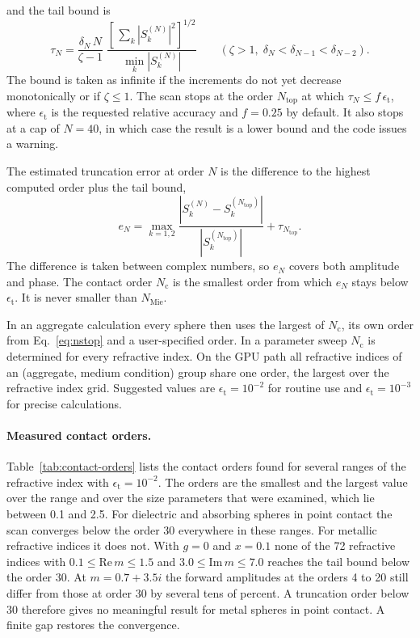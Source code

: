 \documentclass[11pt,a4paper]{article}
\begin{document}
and the tail bound is
\begin{equation}
  \tau_N = \frac{\delta_N\,N}{\zeta - 1}\;
           \frac{\left[\,\sum_k |S_k^{(N)}|^2\right]^{1/2}}{\min_k |S_k^{(N)}|}
  \qquad (\zeta > 1,\; \delta_N < \delta_{N-1} < \delta_{N-2}).
  \label{eq:contact-tail}
\end{equation}
The bound is taken as infinite if the increments do not yet decrease monotonically or if $\zeta \leq 1$.
The scan stops at the order $N_\mathrm{top}$ at which $\tau_N \leq f\,\epsilon_\mathrm{t}$, where $\epsilon_\mathrm{t}$ is the requested relative accuracy and $f = 0.25$ by default.
It also stops at a cap of $N = 40$, in which case the result is a lower bound and the code issues a warning.

The estimated truncation error at order $N$ is the difference to the highest computed order plus the tail bound,
\begin{equation}
  e_N = \max_{k=1,2} \frac{\left|S_k^{(N)} - S_k^{(N_\mathrm{top})}\right|}{\left|S_k^{(N_\mathrm{top})}\right|} + \tau_{N_\mathrm{top}}.
  \label{eq:contact-error}
\end{equation}
The difference is taken between complex numbers, so $e_N$ covers both amplitude and phase.
The contact order $N_\mathrm{c}$ is the smallest order from which $e_N$ stays below $\epsilon_\mathrm{t}$.
It is never smaller than $N_\mathrm{Mie}$.

In an aggregate calculation every sphere then uses the largest of $N_\mathrm{c}$, its own order from Eq.~\eqref{eq:nstop} and a user-specified order.
In a parameter sweep $N_\mathrm{c}$ is determined for every refractive index.
On the GPU path all refractive indices of an (aggregate, medium condition) group share one order, the largest over the refractive index grid.
Suggested values are $\epsilon_\mathrm{t} = 10^{-2}$ for routine use and $\epsilon_\mathrm{t} = 10^{-3}$ for precise calculations.

\paragraph{Measured contact orders.}
Table~\ref{tab:contact-orders} lists the contact orders found for several ranges of the refractive index with $\epsilon_\mathrm{t} = 10^{-2}$.
The orders are the smallest and the largest value over the range and over the size parameters that were examined, which lie between 0.1 and 2.5.
For dielectric and absorbing spheres in point contact the scan converges below the order 30 everywhere in these ranges.
For metallic refractive indices it does not.
With $g = 0$ and $x = 0.1$ none of the 72 refractive indices with $0.1 \leq \mathrm{Re}\,m \leq 1.5$ and $3.0 \leq \mathrm{Im}\,m \leq 7.0$ reaches the tail bound below the order 30.
At $m = 0.7 + 3.5i$ the forward amplitudes at the orders 4 to 20 still differ from those at order 30 by several tens of percent.
A truncation order below 30 therefore gives no meaningful result for metal spheres in point contact.
A finite gap restores the convergence.
\end{document}
